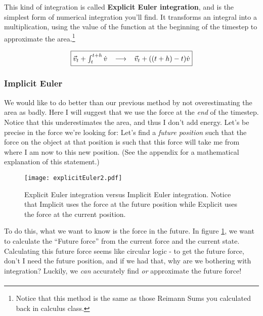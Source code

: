 \documentclass[]{article}
\begin{document}
This kind of integration is called \textbf{Explicit Euler integration}, and is the simplest form of numerical integration you'll find. It transforms an integral into a multiplication, using the value of the function at the beginning of the timestep to approximate the area.\footnote{Notice that this method is the same as those Reimann Sums you calculated back in calculus class.}

\begin{equation}
	\fbox{$
	\vec{v}_t + \int_t^{t+h}\dot{v} \;\;\; \longrightarrow \;\;\; \vec{v}_t + ((t+h) - t)\dot{v}
	$}
\end{equation}

\pagebreak
\subsubsection{Implicit Euler}

We would like to do better than our previous method by not overestimating the area as badly. Here I will suggest that we use the force at the \emph{end} of the timestep. Notice that this underestimates the area, and thus I don't add energy. Let's be precise in the force we're looking for: Let's find a \emph{future position} such that the force on the object at that position is such that this force will take me from where I am now to this new position. (See the appendix for a mathematical explanation of this statement.)

\begin{figure}[htp]
    \centering
    \texttt{[image: explicitEuler2.pdf]}
    \caption{Explicit Euler integration versus Implicit Euler integration. Notice that Implicit uses the force at the future position while Explicit uses the force at the current position.}
	\label{explicitimplicitEuler}
\end{figure}

To do this, what we want to know is the force in the future. In figure \ref{explicitimplicitEuler}, we want to calculate the ``Future force'' from the current force and the current state. Calculating this future force seems like circular logic - to get the future force, don't I need the future position, and if we had that, why are we bothering with integration? Luckily, we \emph{can} accurately find \emph{or} approximate the future force! 

\paragraph{}
\end{document}
